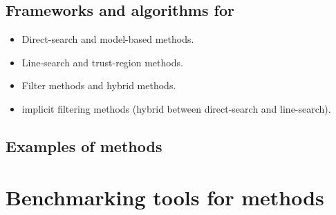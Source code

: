\subsection{Frameworks and algorithms for }

\begin{itemize}
    \item Direct-search and model-based methods.
    \item Line-search and trust-region methods.
    \item Filter methods and hybrid methods.
    \item implicit filtering methods (hybrid between direct-search and line-search).
\end{itemize}

\subsection{Examples of  methods}

\section{Benchmarking tools for  methods}
